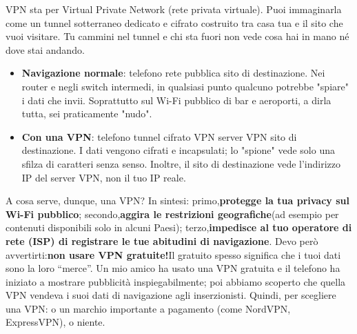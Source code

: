 


VPN sta per Virtual Private Network (rete privata virtuale). Puoi immaginarla come un tunnel sotterraneo dedicato e cifrato costruito tra casa tua e il sito che vuoi visitare. Tu cammini nel tunnel e chi sta fuori non vede cosa hai in mano né dove stai andando.

\begin{itemize}
  \item \textbf{Navigazione normale}: telefono rete pubblica sito di destinazione. Nei router e negli switch intermedi, in qualsiasi punto qualcuno potrebbe "spiare" i dati che invii. Soprattutto sul Wi-Fi pubblico di bar e aeroporti, a dirla tutta, sei praticamente "nudo".
  \item \textbf{Con una VPN}: telefono tunnel cifrato VPN server VPN sito di destinazione. I dati vengono cifrati e incapsulati; lo "spione" vede solo una sfilza di caratteri senza senso. Inoltre, il sito di destinazione vede l'indirizzo IP del server VPN, non il tuo IP reale.
\end{itemize}

A cosa serve, dunque, una VPN? In sintesi: primo,\textbf{protegge la tua privacy sul Wi-Fi pubblico}; secondo,\textbf{aggira le restrizioni geografiche}(ad esempio per contenuti disponibili solo in alcuni Paesi); terzo,\textbf{impedisce al tuo operatore di rete (ISP) di registrare le tue abitudini di navigazione}. Devo però avvertirti:\textbf{non usare VPN gratuite!}Il gratuito spesso significa che i tuoi dati sono la loro “merce”. Un mio amico ha usato una VPN gratuita e il telefono ha iniziato a mostrare pubblicità inspiegabilmente; poi abbiamo scoperto che quella VPN vendeva i suoi dati di navigazione agli inserzionisti. Quindi, per scegliere una VPN: o un marchio importante a pagamento (come NordVPN, ExpressVPN), o niente.

